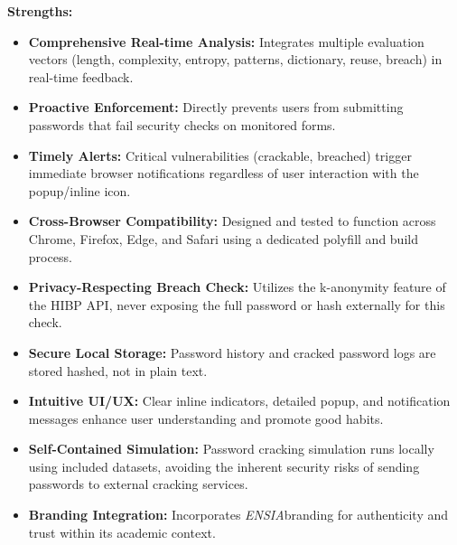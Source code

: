\documentclass[11pt,oneside,a4paper]{book}
\newcommand{\esia}{\textit{ENSIA}}
\begin{document}
\textbf{Strengths:}
\begin{itemize}
    \item \textbf{Comprehensive Real-time Analysis:} Integrates multiple evaluation vectors (length, complexity, entropy, patterns, dictionary, reuse, breach) in real-time feedback.
    \item \textbf{Proactive Enforcement:} Directly prevents users from submitting passwords that fail security checks on monitored forms.
    \item \textbf{Timely Alerts:} Critical vulnerabilities (crackable, breached) trigger immediate browser notifications regardless of user interaction with the popup/inline icon.
    \item \textbf{Cross-Browser Compatibility:} Designed and tested to function across Chrome, Firefox, Edge, and Safari using a dedicated polyfill and build process.
    \item \textbf{Privacy-Respecting Breach Check:} Utilizes the k-anonymity feature of the HIBP API, never exposing the full password or hash externally for this check.
    \item \textbf{Secure Local Storage:} Password history and cracked password logs are stored hashed, not in plain text.
    \item \textbf{Intuitive UI/UX:} Clear inline indicators, detailed popup, and notification messages enhance user understanding and promote good habits.
    \item \textbf{Self-Contained Simulation:} Password cracking simulation runs locally using included datasets, avoiding the inherent security risks of sending passwords to external cracking services.
    \item \textbf{Branding Integration:} Incorporates \esia branding for authenticity and trust within its academic context.
\end{itemize}
\end{document}
